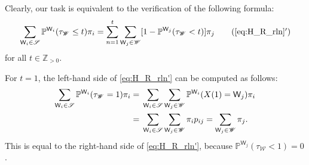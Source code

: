 \documentclass[10pt,journal,compsoc]{IEEEtran}
\begin{document}
\begin{IEEEproof}Clearly, our task is equivalent to the  verification of the following  formula:\begin{align}
\sum_{\mathsf W_i\in\mathscr S}\mathbb P^{\mathsf W_i}(\tau_{\mathscr W}\leq t)\pi_i=\sum_{ n=1}^t\sum_{\mathsf W_j\in\mathscr W}[1-\mathbb P^{\mathsf W_j}(\tau_{  \mathscr W}< t)]\pi_{j}\label{eq:H_R_rln'}\tag{\ref{eq:H_R_rln}$'$}
\end{align}for all $t\in\mathbb Z_{>0}$.

For $ t=1$, the left-hand side of \eqref{eq:H_R_rln'} can be computed as follows:\begin{align}
\sum_{\mathsf W_i\in\mathscr S}\mathbb P^{\mathsf W_i}(\tau_{\mathscr W}=1)\pi_i={}&\sum_{\mathsf W_i\in\mathscr S}\sum_{\mathsf W_j\in\mathscr W}\mathbb P^{\mathsf W_i}(X(1)=\mathsf W_{j})\pi_i\notag\\={}&\sum_{\mathsf W_i\in\mathscr S}\sum_{\mathsf W_j\in\mathscr W}\pi_i p_{ij}=\sum_{\mathsf W_j\in\mathscr W}\pi_j.\label{eq:H_R_rln_1}
\end{align}This is equal to the right-hand side of  \eqref{eq:H_R_rln'}, because  $ \mathbb P^{\mathsf W_j}(\tau_{  \mathscr W}<1)=0$.


\end{IEEEproof}
\end{document}
